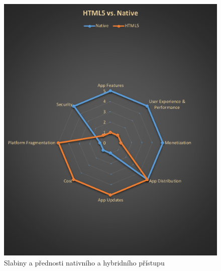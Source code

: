 \begin{figure}\centering
\includegraphics[width=1.0\textwidth]{hybrid_native_graph.png}
\caption{Slabiny a přednosti nativního a hybridního přístupu \cite{mobile_dev_nat_hybrid_graph}}
\label{fig:HybridNativeGraph}
\end{figure}
